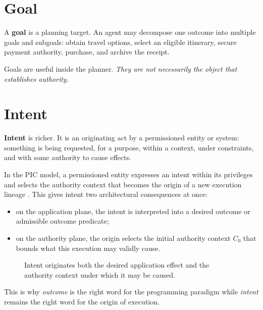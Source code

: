 \documentclass[10pt,oneside,openany]{book}
\newcommand{\term}[1]{\textbf{#1}}
\begin{document}
\section{Goal}
A \term{goal} is a planning target. An agent may decompose one outcome into multiple goals and subgoals: obtain travel options, select an eligible itinerary, secure payment authority, purchase, and archive the receipt.

Goals are useful inside the planner. \emph{They are not necessarily the object that establishes authority.}

\section{Intent}
\term{Intent} is richer. It is an originating act by a permissioned entity or system: something is being requested, for a purpose, within a context, under constraints, and with some authority to cause effects.

In the PIC model, a permissioned entity expresses an intent within its privileges and selects the authority context that becomes the origin of a new execution lineage \cite{gallo2026pic}. This gives intent two architectural consequences at once:

\begin{itemize}
\item on the application plane, the intent is interpreted into a desired outcome or admissible outcome predicate;
\item on the authority plane, the origin selects the initial authority context $C_0$ that bounds what this execution may validly cause.
\end{itemize}

\begin{figure}[ht]
\centering
{}
\caption{Intent originates both the desired application effect and the authority context under which it may be caused.}
\end{figure}

This is why \emph{outcome} is the right word for the programming paradigm while \emph{intent} remains the right word for the origin of execution.
\end{document}
